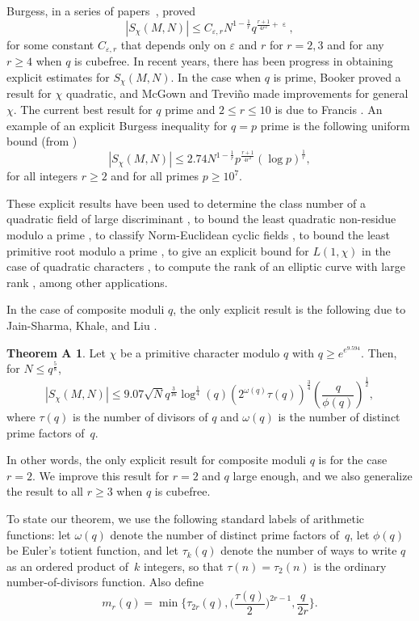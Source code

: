 \documentclass[12pt]{amsart}
\theoremstyle{plain}
\theoremstyle{definition}
\newtheorem{definition}[theorem]{Definition}
\newtheorem*{theoremA*}{Theorem A}
\DeclareMathOperator{\eps}{\varepsilon}
\begin{document}
Burgess, in a series of papers~\cite{burgess:1962,Bur1962,Bur19632,Bur1963,burgess86}, proved
$$|S_{\chi}(M,N)|\le C_{\varepsilon,r} N^{1-\frac{1}{r}}q^{\frac{r+1}{4r^2}+\eps},$$
for some constant $C_{\varepsilon,r}$ that depends only on $\varepsilon$ and $r$ for $r = 2,3$ and for any $r\ge 4$ when $q$ is cubefree. In recent years, there has been progress in obtaining explicit estimates for $S_{\chi}(M,N)$. In the case when $q$ is prime, Booker \cite{Boo2006} proved a result for $\chi$ quadratic, and McGown \cite{mcgown2012} and Trevi\~no \cite{ET2} made improvements for general $\chi$. The current best result for $q$ prime and $2\le r\le 10$ is due to Francis \cite{francis2021}. An example of an explicit Burgess inequality for $q = p$ prime is the following uniform bound (from \cite{ET2})
$$|S_{\chi}(M,N)| \le 2.74 N^{1-\frac{1}{r}}p^{\frac{r+1}{4r^2}}(\log{p})^{\frac{1}{r}},$$
for all integers $r\ge 2$ and for all primes $p\ge 10^7$.

These explicit results have been used to determine the class number of a quadratic field of large discriminant \cite{Boo2006}, to bound the least quadratic non-residue modulo a prime \cite{francis2021,ET2}, to classify Norm-Euclidean cyclic fields \cite{mcgown2012}, to bound the least primitive root modulo a prime \cite{COT-2016}, to give an explicit bound for $L(1,\chi)$ in the case of quadratic characters \cite{JRT-2023}, to compute the rank of an elliptic curve with large rank \cite{Elkies}, among other applications.

In the case of composite moduli $q$, the only explicit result is the following due to Jain-Sharma, Khale, and Liu \cite{JKL}.
\begin{theoremA*} \label{TeoA}
    Let $\chi$ be a primitive character modulo $q$ with $q \ge e^{e^{9.594}}$. Then, for $N\le q^{\frac{5}{8}}$,
    $$\left|S_{\chi}(M,N)\right|\le 9.07 \sqrt{N} q^{\frac{3}{16}} \log^{\frac{1}{4}}(q)\left(2^{\omega(q)}\tau(q)\right)^{\frac{3}{4}}\left(\frac{q}{\phi(q)}\right)^{\frac{1}{2}},$$
    where $\tau(q)$ is the number of divisors of $q$ and $\omega(q)$ is the number of distinct prime factors of~$q$.
\end{theoremA*}

In other words, the only explicit result for composite moduli $q$ is for the case $r =2$. We improve this result for $r =2$ and $q$ large enough, and we also generalize the result to all $r\ge 3$ when $q$ is cubefree. 

To state our theorem, we use the following standard labels of arithmetic functions:
let $\omega(q)$ denote the number of distinct prime factors of~$q$, let $\phi(q)$ be Euler's totient function, and let $\tau_{k}(q)$ denote the number of ways to write $q$ as an ordered product of~$k$ integers, so that $\tau(n) = \tau_2(n)$ is the ordinary number-of-divisors function. Also define
\begin{equation} \label{meet Mr. Q}
m_r(q) = \min \biggl\{ \tau_{2r}(q), \biggl( \frac{\tau(q)}2 \biggr)^{2r-1} , \frac{q}{2r} \biggr\}.
\end{equation}
\end{document}

